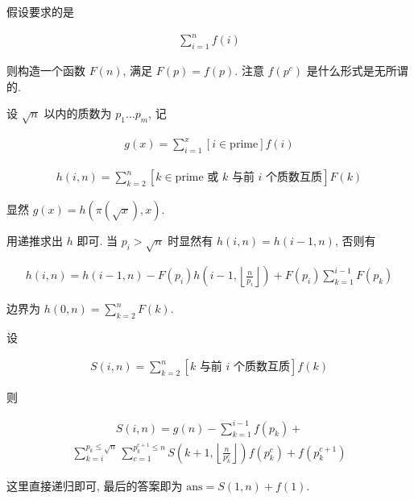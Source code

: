 假设要求的是

$$ \begin{aligned} \sum_{i = 1} ^ n f(i) \end{aligned} $$

则构造一个函数 $F(n)$, 满足 $F(p) = f(p)$. 注意 $f(p^c)$ 是什么形式是无所谓的.

设 $\sqrt n$ 以内的质数为 $p_1 \dots p_m$, 记

$$ \begin{aligned} g(x) = \sum_{i = 1} ^ x \left[i \in \text{prime}\right] f(i) \end{aligned} $$

$$ \begin{aligned} h(i, n) = \sum_{k = 2} ^ n \left[ k \in \text{prime 或 } k \text{ 与前 } i \text{ 个质数互质} \right] F(k) \end{aligned} $$

显然 $g(x) = h\left( \pi\left(\sqrt x\right), x \right)$.

用递推求出 $h$ 即可. 当 $p_i > \sqrt n$ 时显然有 $h(i, n) = h(i - 1, n)$, 否则有

$$ \begin{aligned} h(i, n) =  h(i - 1, n) - F(p_i) h\left( i - 1, \left\lfloor \frac n {p_i} \right\rfloor \right) + F(p_i) \sum_{k = 1} ^ {i - 1} F(p_k) \end{aligned} $$

边界为 $h(0, n) = \sum_{k = 2} ^ n F(k)$.

设

$$ \begin{aligned} S(i, n) = \sum_{k = 2} ^ n \left[ k \text{ 与前 } i \text{ 个质数互质} \right] f(k) \end{aligned}$$

则

$$ \begin{aligned} S(i, n) = g(n) - \sum_{k = 1} ^ {i - 1} f(p_k) + \end{aligned} $$
$$ \begin{aligned} \sum_{k = i} ^ {p_k \le \sqrt n} \sum_{c = 1} ^ {p_k ^ {c + 1} \le n} S\left( k + 1, \left\lfloor \frac n {p_k ^ c} \right\rfloor \right) f\left( p_k ^ c \right) + f\left( p_k ^ {c + 1} \right) \end{aligned} $$

这里直接递归即可, 最后的答案即为 $\text{ans} = S(1, n) + f(1)$.